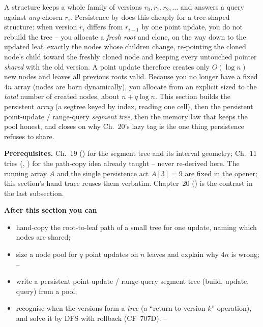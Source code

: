 \begin{topicintro}
A  structure keeps a whole family of versions \(r_0, r_1, r_2, \dots\) and answers a query against \emph{any} chosen \(r_i\).  Persistence by  does this cheaply for a tree-shaped structure: when version \(r_i\) differs from \(r_{i-1}\) by one point update, you do not rebuild the tree -- you allocate a \emph{fresh root} and clone, on the way down to the updated leaf, exactly the nodes whose children change, re-pointing the cloned node's child toward the freshly cloned node and keeping every untouched pointer \emph{shared} with the old version.  A point update therefore creates only \(O(\log n)\) new nodes and leaves all previous roots valid.  Because you no longer have a fixed \(4n\) array (nodes are born dynamically), you allocate from an explicit  sized to the \emph{total} number of created nodes, about \(n + q\log n\).  This section builds the persistent \emph{array} (a segtree keyed by index, reading one cell), then the persistent point-update / range-query \emph{segment tree}, then the memory law that keeps the pool honest, and closes on why Ch.~20's lazy tag is the one thing persistence refuses to share.

\textbf{Prerequisites.} Ch.~19 () for the segment tree and its interval geometry; Ch.~11 tries (, ) for the path-copy idea already taught -- never re-derived here.  The running array \(A\) and the single persistence act \(A[3]=9\) are fixed in the opener; this section's hand trace reuses them verbatim.  Chapter~20 () is the contrast in the last subsection.

\textbf{After this section you can}
\begin{itemize}[nosep]
  \item hand-copy the root-to-leaf path of a small tree for one update, naming which nodes are shared; \hfill{}
  \item size a node pool for \(q\) point updates on \(n\) leaves and explain why \(4n\) is wrong; \hfill{}--
  \item write a persistent point-update / range-query segment tree (build, update, query) from a pool; \hfill{}
  \item recognise when the versions form a \emph{tree} (a ``return to version \(k\)'' operation), and solve it by DFS with rollback (CF~707D). \hfill{}--
\end{itemize}
\end{topicintro}

